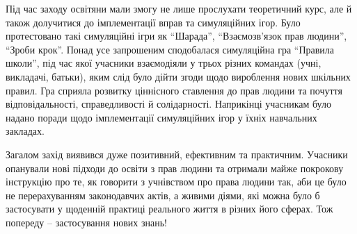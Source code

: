 
Під час заходу освітяни мали змогу не лише прослухати теоретичний курс, але й
також долучитися до імплементації вправ та симуляційних ігор. Було протестовано
такі симуляційні ігри як \enquote{Шарада}, \enquote{Взаємозв'язок прав людини},
\enquote{Зроби крок}. Понад усе запрошеним сподобалася симуляційна гра
\enquote{Правила школи}, під час якої учасники взаємодіяли у трьох різних
командах (учні, викладачі, батьки), яким слід було дійти згоди щодо вироблення
нових шкільних правил. Гра сприяла розвитку ціннісного ставлення до прав людини
та почуття відповідальності, справедливості й солідарності. Наприкінці
учасникам було надано поради щодо імплементації симуляційних ігор у їхніх
навчальних закладах. 


Загалом захід виявився дуже позитивний, ефективним та
практичним. Учасники опанували нові підходи до освіти з прав людини та отримали
майже покрокову інструкцію про те, як говорити з учнівством про права людини
так, аби це було не перерахуванням законодавчих актів, а живими діями, які
можна було б застосувати у щоденній практиці реального життя в різних його
сферах. Тож попереду – застосування нових знань!


